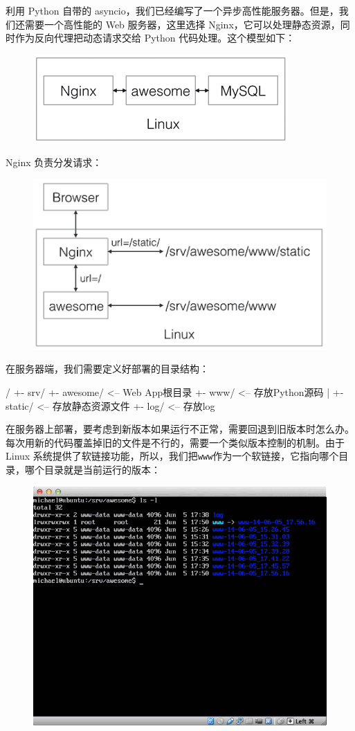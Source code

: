 利用 Python 自带的
asyncio，我们已经编写了一个异步高性能服务器。但是，我们还需要一个高性能的
Web 服务器，这里选择
Nginx，它可以处理静态资源，同时作为反向代理把动态请求交给 Python
代码处理。这个模型如下：

 
 \begin{figure}[htp]
	\centering
	\includegraphics[width=0.6\linewidth]{fig/1019633050057984l.png}
\end{figure}


Nginx 负责分发请求：

 
 \begin{figure}[htp]
	\centering
	\includegraphics[width=0.6\linewidth]{fig/1019633079028160l.png}
\end{figure}


在服务器端，我们需要定义好部署的目录结构：

\begin{pythoncode}
/
+- srv/
   +- awesome/       <-- Web App根目录
      +- www/        <-- 存放Python源码
      |  +- static/  <-- 存放静态资源文件
      +- log/        <-- 存放log
\end{pythoncode}

在服务器上部署，要考虑到新版本如果运行不正常，需要回退到旧版本时怎么办。每次用新的代码覆盖掉旧的文件是不行的，需要一个类似版本控制的机制。由于
Linux
系统提供了软链接功能，所以，我们把\texttt{www}作为一个软链接，它指向哪个目录，哪个目录就是当前运行的版本：

 
 \begin{figure}[htp]
	\centering
	\includegraphics[width=0.6\linewidth]{fig/956187757507296.png}
\end{figure}


